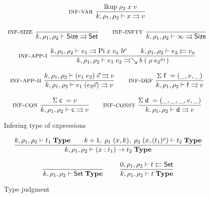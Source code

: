 \begin{figure}[p]
\begin{gather*}
	  \mbox{\sc inf-var}\ \dfrac{\mathrm{lkup} \; \rho_2 \; x \; v}{k,\rho_1,\rho_2\vdash x\rightrightarrows v}
\\[2ex]
	  \mbox{\sc inf-size}\ \dfrac{}{k,\rho_1,\rho_2\vdash\mathsf{Size}\rightrightarrows\mathsf{Set}}
\qquad
	  \mbox{\sc inf-infty}\ \dfrac{}{k,\rho_1,\rho_2\vdash\infty\rightrightarrows\mathsf{Size}} 
\\[2ex]
\mbox{\sc inf-app-i}\ \dfrac{k,\rho_1,\rho_2\vdash e_1\rightrightarrows\mathrm{Pi} \; x \; v_a \; b^{\rho}
\qquad k,\rho_1,\rho_2\vdash e_2\leftleftarrows v_a}{k,\rho_1,\rho_2\vdash e_1 \; e_2\rightrightarrows\searrow b \; ( \; \rho \; {e_2}^{\rho_1})}
\\[2ex]
\mbox{\sc inf-app-ii}\ \dfrac{k,\rho_1,\rho_2\vdash(e_1 \; e_2)\;\vec{e}\rightrightarrows v}{k,\rho_1,\rho_2\vdash e_1 \; (e_2 \vec{e})\rightrightarrows v}
\qquad
\mbox{\sc inf-def}\ \dfrac{\mathrm{\Sigma} \; \mathsf{f} \; = (\_,v,\_) }{k,\rho_1,\rho_2\vdash\mathsf{f}\rightrightarrows v}
\\[2ex]
\mbox{\sc inf-con}\ \dfrac{\mathrm{\Sigma} \; \mathsf{c} \; = v}{k,\rho_1,\rho_2\vdash\mathsf{c}\rightrightarrows v} 
\qquad
\mbox{\sc inf-const}\ \dfrac{\mathrm{\Sigma} \; \mathsf{d} \; = (\_,\_,\_,v,\_)}{k,\rho_1,\rho_2\vdash\mathsf{d}\rightrightarrows v}
\end{gather*}
\caption{Infering type of expressions}
\end{figure}

\begin{figure}
\begin{gather*}
\ \dfrac{k,\rho_1,\rho_2\vdash t_1\;\mathbf{Type}
\qquad
k+1, \; \rho_1 \; (x,k), \; \rho_2 \; (x,(t_1)^{\rho})\vdash t_2\;\mathbf{Type}}{k,\rho_1,\rho_2\vdash( x : t_1 ) \rightarrow{t_2}\;\mathbf{Type}}
\\[2ex]
\ \dfrac{}{k,\rho_1,\rho_2\vdash\mathsf{Set}\;\mathbf{Type}}
\qquad
\ \dfrac{0,\rho_1,\rho_2\vdash t\leftleftarrows\mathsf{Set}}{k,\rho_1,\rho_2\vdash t\;\mathbf{Type}}
\end{gather*}
\caption{Type judgment}
\end{figure}

